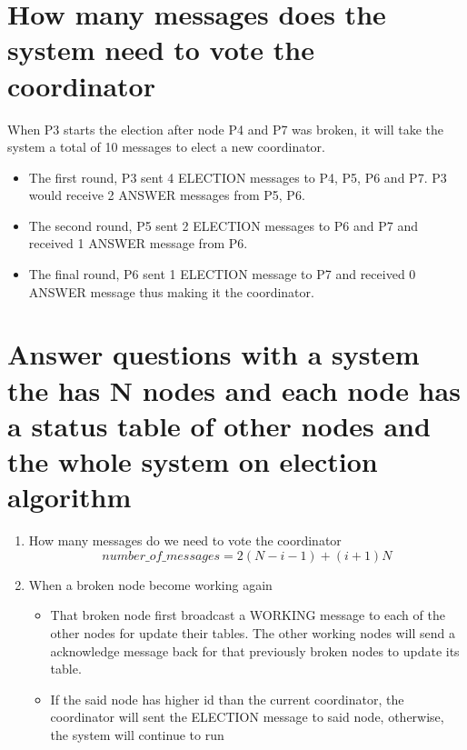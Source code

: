 \documentclass[11pt,a4paper]{article}
\begin{document}
\section{How many messages does the system need to vote the coordinator}
When P3 starts the election after node P4 and P7 was broken, it will take the system a total of 10 messages to elect a new coordinator.
\begin{itemize}
	\item The first round, P3 sent 4 ELECTION messages to P4, P5, P6 and P7. P3 would receive 2 ANSWER messages from P5, P6.
	\item The second round, P5 sent 2 ELECTION messages to P6 and P7 and received 1 ANSWER message from P6.
	\item The final round, P6 sent 1 ELECTION message to P7 and received 0 ANSWER message thus making it the coordinator.
\end{itemize}

\section{Answer questions with a system the has N nodes and each node has a status table of other nodes and the whole system on election algorithm}
\begin{enumerate}[label=\alph*)]
	\item How many messages do we need to vote the coordinator
	\[number\_of\_messages = 2(N-i-1) + (i+1)N\]
	\item When a broken node become working again
	\begin{itemize}
		\item That broken node first broadcast a WORKING message to each of the other nodes for update their tables. The other working nodes will send a acknowledge message back for that previously broken nodes to update its table.
		\item If the said node has higher id than the current coordinator, the coordinator will sent the ELECTION message to said node, otherwise, the system will continue to run
	\end{itemize}
\end{enumerate}
\end{document}
